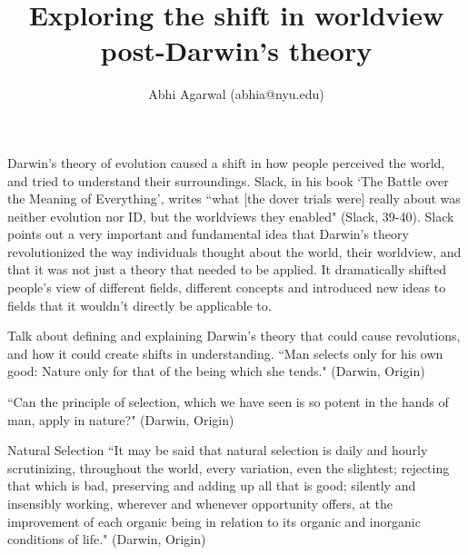 \documentclass[11pt, oneside]{article}
\title{Exploring the shift in worldview post-Darwin's theory}
\author{Abhi Agarwal (abhia@nyu.edu)}
\date{}
\begin{document}
\maketitle



\par Darwin's theory of evolution caused a shift in how people perceived the world, and tried to understand their surroundings. Slack, in his book `The Battle over the Meaning of Everything', writes ``what [the dover trials were] really about was neither evolution nor ID, but the worldviews they enabled" (Slack, 39-40). Slack points out a very important and fundamental idea that Darwin's theory revolutionized the way individuals thought about the world, their worldview, and that it was not just a theory that needed to be applied. It dramatically shifted people's view of different fields, different concepts and introduced new ideas to fields that it wouldn't directly be applicable to.



\par Talk about defining and explaining Darwin's theory that could cause revolutions, and how it could create shifts in understanding.
``Man selects only for his own good: Nature only for that of the being which she tends." (Darwin, Origin)

``Can the principle of selection, which we have seen is so potent in the hands of man, apply in nature?" (Darwin, Origin)

\par Natural Selection ``It may be said that natural selection is daily and hourly scrutinizing, throughout the world, every variation, even the slightest; rejecting that which is bad, preserving and adding up all that is good; silently and insensibly working, wherever and whenever opportunity offers, at the improvement of each organic being in relation to its organic and inorganic conditions of life." (Darwin, Origin)
\end{document}
